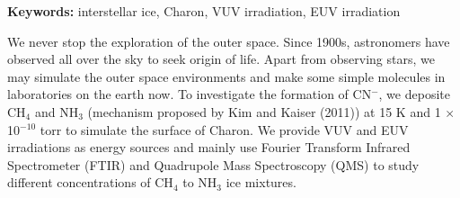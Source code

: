 \begin{abstracten}

{\bf \sf Keywords:} interstellar ice, Charon, VUV irradiation, EUV irradiation

\vspace{2em}

We never stop the exploration of the outer space. Since 1900s, astronomers have observed all over the sky to seek origin of life. Apart from observing stars, we may simulate the outer space environments and make some simple molecules in laboratories on the earth now. To investigate the formation of CN$^-$, we deposite CH$_4$ and NH$_3$ (mechanism proposed by Kim and Kaiser (2011)\cite{kim}) at 15 K and 1 $\times$ 10$^{-10}$ torr to simulate the surface of Charon. We provide VUV and EUV irradiations as energy sources and mainly use Fourier Transform Infrared Spectrometer (FTIR) and Quadrupole Mass Spectroscopy (QMS) to study different concentrations of CH$_4$ to NH$_3$ ice mixtures.

\end{abstracten} 

